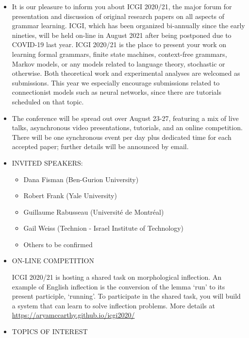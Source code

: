\documentclass{article}
\begin{document}
\begin{itemize}\item  It is our pleasure to inform you about ICGI 2020/21, the major forum for presentation and discussion of original research papers on all aspects of grammar learning. ICGI, which has been organized bi-annually since the early nineties, will be held on-line in August 2021 after being postponed due to COVID-19 last year. ICGI 2020/21 is the place to present your work on learning formal grammars, finite state machines, context-free grammars, Markov models, or any models related to language theory, stochastic or otherwise. Both theoretical work and experimental analyses are welcomed as submissions. This year we especially encourage submissions related to connectionist models such as neural networks, since there are tutorials scheduled on that topic.  
 
\item  The conference will be spread out over August 23-27, featuring a mix of live talks, asynchronous video presentations, tutorials, and an online competition. There will be one synchronous event per day plus dedicated time for each accepted paper; further details will be announced by email. 
 
\item  INVITED SPEAKERS:  
 
\begin{itemize}\item  Dana Fisman (Ben-Gurion University) 
\item  Robert Frank (Yale University) 
\item  Guillaume Rabusseau (Université de Montréal) 
\item  Gail Weiss (Technion - Israel Institute of Technology) 
\item  Others to be confirmed
\end{itemize} 
\item  ON-LINE COMPETITION 
 
 ICGI 2020/21 is hosting a shared task on morphological inflection. An example of English inflection is the conversion of the lemma ‘run’ to its present participle, ‘running’. To participate in the shared task, you will build a system that can learn to solve inflection problems. More details at \href{https://aryamccarthy.github.io/icgi2020/}{https://aryamccarthy.github.io/icgi2020/}  
 
\item  TOPICS OF INTEREST 
 

\end{itemize}
\end{document}
